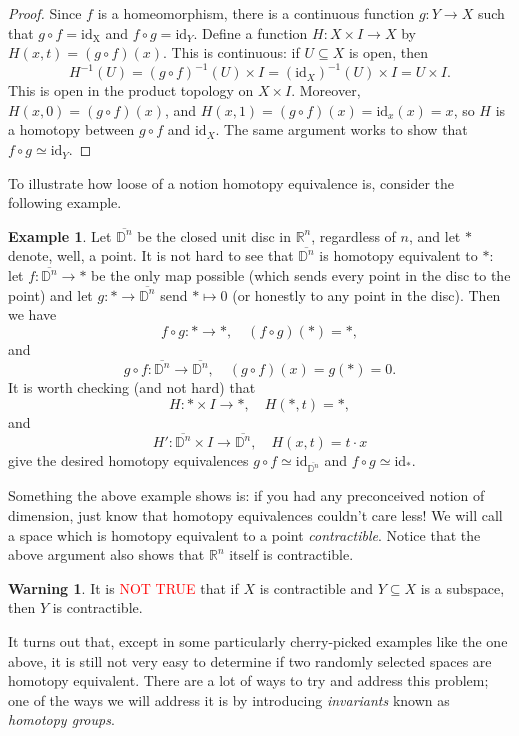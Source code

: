 \documentclass[10pt]{amsart}
\theoremstyle{definition}
\newtheorem{ex}[thm]{Example}
\newtheorem{watchout}[thm]{\warning \textbf{Warning} \warning}
\newcommand{\cdef}[1]{\textcolor{Bittersweet}{#1}}
\renewcommand{\bar}[1]{\overline{#1}}
\begin{document}
\begin{proof}
    Since $f$ is a homeomorphism, there is a continuous function $g:Y \to X$ such that $g \circ f = \text{id}_\text{X}$ and $f \circ g = \text{id}_Y$. Define a function $H:X \times I \to X$ by $H(x, t) = (g \circ f)(x)$. This is continuous: if $U \subseteq X$ is open, then 
    \[H^{-1}(U) = (g \circ f)^{-1}(U) \times I = (\text{id}_X)^{-1}(U) \times I = U \times I.\]
    This is open in the product topology on $X \times I.$ Moreover, $H(x, 0) = (g \circ f)(x)$, and $H(x, 1) = (g \circ f)(x) = \text{id}_x(x) = x$, so $H$ is a homotopy between $g \circ f$ and $\text{id}_X$. The same argument works to show that $f \circ g \simeq \text{id}_Y$.
\end{proof}
To illustrate how loose of a notion homotopy equivalence is, consider the following example.
\begin{ex}
    Let $\bar{\mathbb{D}^n}$ be the closed unit disc in $\mathbb{R}^n$, regardless of $n$, and let $*$ denote, well, a point. It is not hard to see that $\bar{\mathbb{D}^n}$ is homotopy equivalent to $*$: let $f:\bar{\mathbb{D}^n} \to *$ be the only map possible (which sends every point in the disc to the point) and let $g:* \to \bar{\mathbb{D}^n}$ send $* \mapsto 0$ (or honestly to any point in the disc). Then we have
    \[f \circ g:* \to *, \quad (f \circ g)(*) = *,\]
    and 
    \[g \circ f:\bar{\mathbb{D}^n} \to \bar{\mathbb{D}^n}, \quad (g \circ f)(x) = g(*) = 0.\]
    It is worth checking (and not hard) that
    \[H: * \times I \to *, \quad H(*, t) = *,\]
    and 
    \[H': \bar{\mathbb{D}^n} \times I \to \bar{\mathbb{D}^n}, \quad H(x, t) = t \cdot x \]
    give the desired homotopy equivalences $g \circ f \simeq \text{id}_{\bar{\mathbb{D}^n}}$ and $f \circ g \simeq \text{id}_{*}$.
\end{ex}
Something the above example shows is: if you had any preconceived notion of dimension, just know that homotopy equivalences couldn't care less! We will call a space which is homotopy equivalent to a point \cdef{\emph{contractible}}. Notice that the above argument also shows that $\mathbb{R}^n$ itself is contractible.

\begin{watchout}
    It is \textcolor{red}{NOT TRUE} that if $X$ is contractible and $Y \subseteq X$ is a subspace, then $Y$ is contractible.
\end{watchout}

It turns out that, except in some particularly cherry-picked examples like the one above, it is still not very easy to determine if two randomly selected spaces are homotopy equivalent. There are a lot of ways to try and address this problem; one of the ways we will address it is by introducing \emph{invariants} known as \cdef{\emph{homotopy groups}}. 
\end{document}
